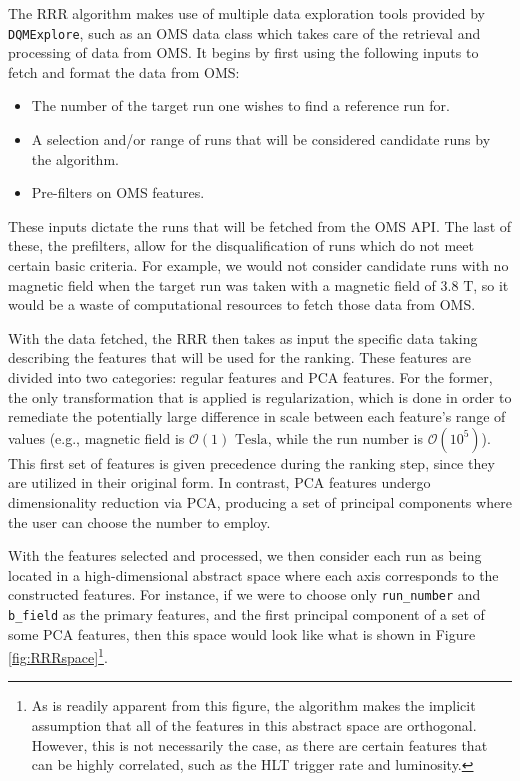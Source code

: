 The RRR algorithm makes use of multiple data exploration tools provided by \texttt{DQMExplore}, such as an OMS data class which takes care of the retrieval and processing of data from OMS. It begins by first using the following inputs to fetch and format the data from OMS:

\begin{itemize}
    \item The number of the target run one wishes to find a reference run for.
    \item A selection and/or range of runs that will be considered candidate runs by the algorithm.
    \item Pre-filters on OMS features.
\end{itemize}

\noindent These inputs dictate the runs that will be fetched from the OMS API. The last of these, the prefilters, allow for the disqualification of runs which do not meet certain basic criteria. For example, we would not consider candidate runs with no magnetic field when the target run was taken with a magnetic field of $3.8 \text{ T}$, so it would be a waste of computational resources to fetch those data from OMS.

With the data fetched, the RRR then takes as input the specific data taking describing the features that will be used for the ranking. These features are divided into two categories: regular features and PCA features. For the former, the only transformation that is applied is regularization, which is done in order to remediate the potentially large difference in scale between each feature's range of values (e.g., magnetic field is $\mathcal O(1)\text{ Tesla}$, while the run number is $\mathcal O(10^5)$). This first set of features is given precedence during the ranking step, since they are utilized in their original form. In contrast, PCA features undergo dimensionality reduction via PCA, producing a set of principal components where the user can choose the number to employ.

With the features selected and processed, we then consider each run as being located in a high-dimensional abstract space where each axis corresponds to the constructed features. For instance, if we were to choose only \texttt{run\_number} and \texttt{b\_field} as the primary features, and the first principal component of a set of some PCA features, then this space would look like what is shown in Figure \ref{fig:RRRspace}\footnote{As is readily apparent from this figure, the algorithm makes the implicit assumption that all of the features in this abstract space are orthogonal. However, this is not necessarily the case, as there are certain features that can be highly correlated, such as the HLT trigger rate and luminosity.}.

